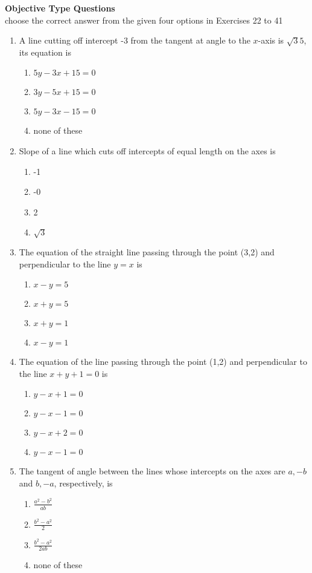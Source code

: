 \documentclass[12pt]{article}
\begin{document}
\textbf{Objective Type Questions}\\
choose the correct answer from the given four options in Exercises 22 to 41
\begin{enumerate}[resume]
\item A line cutting off intercept -3 from the tangent at angle to the $x$-axis is $\sqrt{3}{5}$, its equation is
\begin{enumerate}
\item $5y-3x+15=0$
\item $3y-5x+15=0$
\item $5y-3x-15=0$
\item none of these
\end{enumerate}
\item Slope of a line which cuts off intercepts of equal length on the axes is 
\begin{enumerate}
\item -1
\item -0
\item 2
\item $\sqrt{3}$
\end{enumerate}
\item The equation of the straight line passing through the point (3,2) and perpendicular to the line $y=x$ is
\begin{enumerate}
\item $x-y=5$
\item $x+y=5$
\item $x+y=1$
\item $x-y=1$
\end{enumerate}
\item The equation of the line passing through the point (1,2) and perpendicular to the line $x+y+1=0$ is
\begin {enumerate}
\item $y-x+1=0$
\item $y-x-1=0$
\item $y-x+2=0$
\item $y-x-1=0$
\end{enumerate}
\item The tangent of angle between the lines whose intercepts on the axes are $a,-b$ and $b,-a$, respectively, is
\begin{enumerate}
\item $\frac{a^2-b^2}{ab}$
\item $\frac{b^2-a^2}{2}$
\item $\frac{b^2-a^2}{2ab}$
\item none of these 

\end{enumerate}
\end{enumerate}
\end{document}
